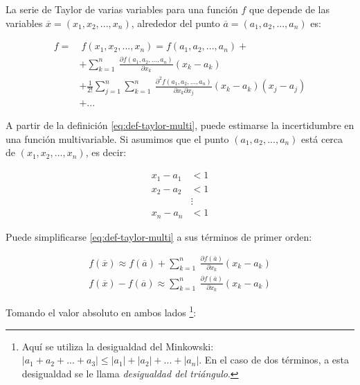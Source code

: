 \begin{definition}

    La serie de Taylor de varias variables para una función $f$ que depende
    de las variables $\overline{x} = (x_1, x_2, ..., x_n)$, alrededor del
    punto $ \overline{a} = (a_1, a_2, ..., a_n)$ es:

    \begin{align*}
        f = & \ f(x_1, x_2, ..., x_n) = f(a_1, a_2, ..., a_n) + \\ 
            & + \sum_{k=1}^{n} \
            \frac{\partial f(a_1,a_2,...,a_n)}{\partial x_k}(x_k-a_k)\\
            & + \frac{1}{2!} \sum_{j=1}^{n} \sum_{k=1}^{n} \
            \frac{\partial^2 f(a_1,a_2,...,a_n)}{\partial x_k \partial
            x_j}(x_k-a_k)(x_j-a_j)\\
            & + ...
    \end{align*}
    \label{eq:def-taylor-multi}

\end{definition}

A partir de la definición \ref{eq:def-taylor-multi}, puede estimarse la
incertidumbre en una función multivariable. Si asumimos que el punto $(a_1, a_2,
..., a_n)$ está cerca de $(x_1, x_2, ..., x_n)$, es decir:

\begin{align*}
    x_1 - a_1 &< 1 \\
    x_2 - a_2 &< 1 \\
              &\vdots \\
    x_n - a_n &< 1
\end{align*}

Puede simplificarse \ref{eq:def-taylor-multi} a sus términos de primer orden:

\begin{align*}
    f(\overline{x}) \approx f(\overline{a}) + \sum_{k=1}^{n} \
    \frac{\partial f(\overline{a})}{\partial x_k} (x_k - a_k) \\
    f(\overline{x}) - f(\overline{a}) \approx \sum_{k=1}^{n} \
    \frac{\partial f(\overline{a})}{\partial x_k} (x_k - a_k)
\end{align*}

Tomando el valor absoluto en ambos lados \footnote{Aquí se utiliza la
    desigualdad del Minkowski: $|a_1 + a_2 + ... + a_3| \leq |a_1| + |a_2| + ... +
    |a_n|$. En el caso de dos términos, a esta desigualdad se le llama
\textit{desigualdad del triángulo}.}:

